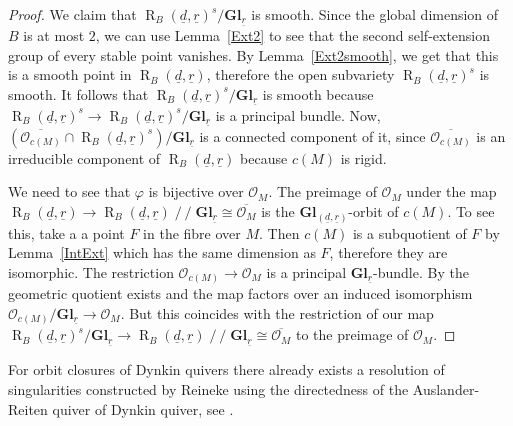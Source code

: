 \documentclass[11pt,a4paper]{amsart}
\theoremstyle{plain}
\theoremstyle{definition}
\begin{document}
\begin{proof}
We claim that ${\operatorname{R}_B(\underline{d},\underline{r})}^{s}/{\mathbf{Gl}_{\underline{r}}}$ is smooth. Since the global dimension of $B$ is at most $2$, we can use Lemma~\ref{Ext2} to see that the second self-extension group of every stable point vanishes. By Lemma~\ref{Ext2smooth}, we get that this is a smooth point in ${\operatorname{R}_B(\underline{d},\underline{r})}$, therefore the open subvariety 
 ${\operatorname{R}_B(\underline{d},\underline{r})}^{s}$ is smooth. It follows that ${\operatorname{R}_B(\underline{d},\underline{r})}^{s}/ {\mathbf{Gl}_{\underline{r}}}$ is smooth because ${\operatorname{R}_B(\underline{d},\underline{r})}^{s}\to {\operatorname{R}_B(\underline{d},\underline{r})}^{s}/ {\mathbf{Gl}_{\underline{r}}}$ is a principal bundle. Now, $(\overline{{\mathcal{O}}_{c(M)}}\cap {\operatorname{R}_B(\underline{d},\underline{r})}^{s}) / {\mathbf{Gl}_{\underline{r}}}$ is a connected component of it, since $\overline{{\mathcal{O}}_{c(M)}}$ is an irreducible component of ${\operatorname{R}_B(\underline{d},\underline{r})}$ because $c(M)$ is rigid. 

We need to see that $\varphi$ is bijective over ${\mathcal{O}}_M$. The preimage of ${\mathcal{O}}_M$ under the map ${\operatorname{R}_B(\underline{d},\underline{r})} \to {\operatorname{R}_B(\underline{d},\underline{r})}\operatorname{/\!\!/}{\mathbf{Gl}_{\underline{r}}} \cong \overline{{\mathcal{O}}_M}$ is the ${\mathbf{Gl}}_{({\underline{d}}, {\underline{r}}) }$-orbit of ${c} (M)$. To see this, take a a point $F$ in the fibre over $M$. Then ${c} (M)$ is a subquotient of $F$ by 
Lemma~\ref{IntExt} which has the same dimension as $F$, therefore they are isomorphic. The restriction ${\mathcal{O}}_{{c} (M)} \to {\mathcal{O}}_{M}$ is a principal ${\mathbf{Gl}_{\underline{r}}}$-bundle. By \cite[Theorem 5.25]{Bo} the geometric quotient exists and the map factors over an induced isomorphism 
$ {\mathcal{O}}_{{c} (M) } / {\mathbf{Gl}_{\underline{r}}} \to {\mathcal{O}}_M $. But this coincides with the restriction of our map ${\operatorname{R}_B(\underline{d},\underline{r})}^{s}/{\mathbf{Gl}_{\underline{r}}} \to {\operatorname{R}_B(\underline{d},\underline{r})}\operatorname{/\!\!/}{\mathbf{Gl}_{\underline{r}}} \cong \overline{{\mathcal{O}}_M}$ to the preimage of ${\mathcal{O}}_M$. 
\end{proof}

For orbit closures of Dynkin quivers there already exists a resolution of singularities constructed by Reineke using the directedness of the Auslander-Reiten quiver of Dynkin quiver, see \cite{R}. 
\end{document}
